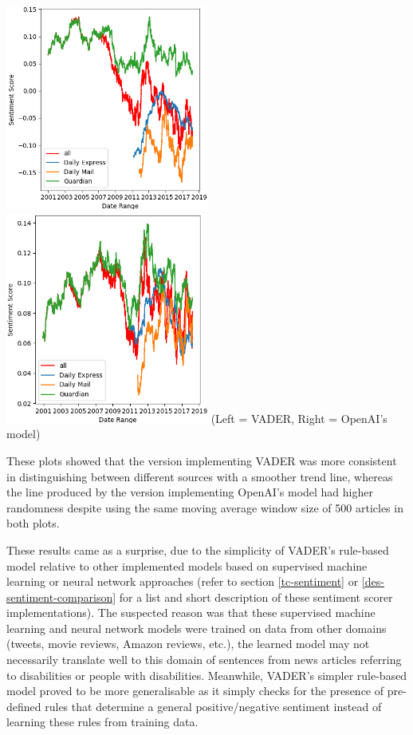 \documentclass{report}
\begin{document}
\noindent
\includegraphics[width=0.5\textwidth]{vader.png}
\includegraphics[width=0.5\textwidth]{openai.png}
(Left = VADER, Right = OpenAI's model)
\vspace{0.5em}

These plots showed that the version implementing VADER was more consistent in distinguishing between different sources with a smoother trend line, whereas the line produced by the version implementing OpenAI's model had higher randomness despite using the same moving average window size of 500 articles in both plots.

These results came as a surprise, due to the simplicity of VADER's rule-based model relative to other implemented models based on supervised machine learning or neural network approaches (refer to section \ref{tc-sentiment} or \ref{des-sentiment-comparison} for a list and short description of these sentiment scorer implementations).
The suspected reason was that these supervised machine learning and neural network models were trained on data from other domains (tweets, movie reviews, Amazon reviews, etc.), the learned model may not necessarily translate well to this domain of sentences from news articles referring to disabilities or people with disabilities. 
Meanwhile, VADER's simpler rule-based model proved to be more generalisable as it simply checks for the presence of pre-defined rules that determine a general positive/negative sentiment instead of learning these rules from training data.
\end{document}
